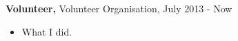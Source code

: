 {{\bf Volunteer,} Volunteer Organisation}, July 2013 - Now
\begin{itemize}
\item What I did.
\end{itemize}
